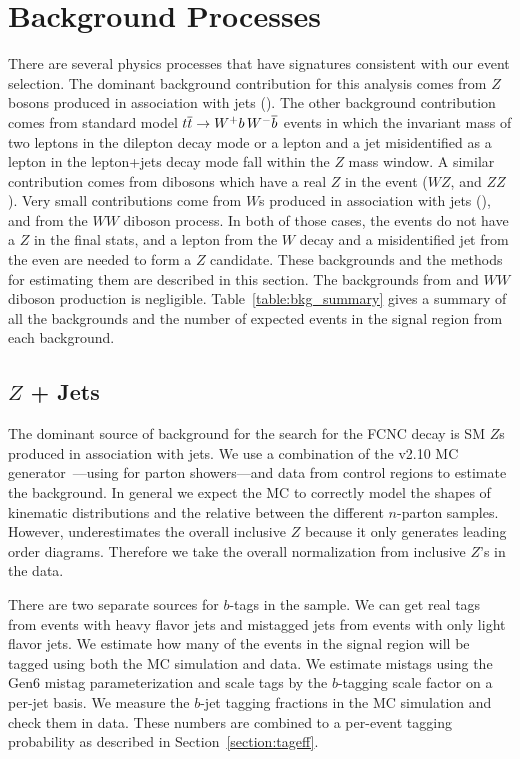 \section{Background Processes}
There are several physics processes that have signatures consistent
with our event selection. The dominant background contribution for
this analysis comes from $Z$ bosons produced in association with jets
(\Zj). The other background contribution comes from
standard model ${t\overline{t}} \rightarrow W^{+} b \, W^{-} \overline{b}$ events in which the
invariant mass of two leptons in the dilepton decay mode or a lepton
and a jet misidentified as a lepton in the lepton+jets decay mode fall
within the $Z$ mass window. A similar contribution comes from
dibosons which have a real $Z$ in the event ($WZ$, and $ZZ$). Very small 
contributions come from $W$s produced in association with jets (\Wj), and 
from the $WW$ diboson process. In both of those cases, the events do not
have a $Z$ in the final stats, and a lepton from the $W$ decay and a 
misidentified jet from the even are needed to form a $Z$ candidate. 
These backgrounds and the methods for estimating them are described in this
section. The backgrounds from \Wj and $WW$ diboson production is negligible.
Table~\ref{table:bkg_summary} gives a summary of all the backgrounds
and the number of expected events in the signal region from each
background.

\subsection[$Z$ + Jets]{\boldmath $Z$ + Jets\unboldmath}
The dominant source of background for the search for the FCNC decay
\tZq is SM $Z$s produced in association with jets. We use a combination
of the \alp v2.10 MC generator~\cite{Mangano:2002ea}---using \pyth for
parton showers---and data from control regions to estimate the \Zj
background. In general we expect the \alp MC to correctly model the
shapes of kinematic distributions and the relative \xsects between
the different $n$-parton samples. However, \alp underestimates the
overall inclusive $Z$ \xsect because it only generates leading order
diagrams. Therefore we take the overall normalization from inclusive
$Z$'s in the data.

There are two separate sources for $b$-tags in the \Zj sample. We can
get real tags from events with heavy flavor jets and mistagged jets from
events with only light flavor jets.  We estimate how many of the
\Zj events in the signal region will be tagged using both the MC
simulation and data.  We estimate mistags using the
Gen6 mistag parameterization and scale tags by the $b$-tagging scale factor
on a per-jet basis. We measure the $b$-jet tagging fractions in the MC
simulation and check them in data. These numbers are combined to a per-event
tagging probability as described in Section~\ref{section:tageff}.

